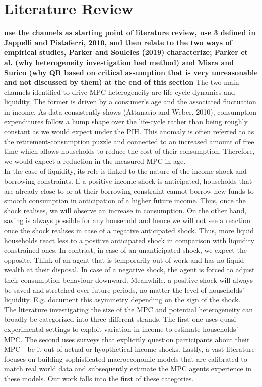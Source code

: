 \section{Literature Review} \label{sec:lit}
\textbf{use the channels as starting point of literature review, use 3 defined in Jappelli and Pistaferri, 2010, and then relate to the two ways of empirical studies, Parker and Souleles (2019) characterize; Parker et al. (why heterogeneity investigation bad method) and Misra and Surico (why QR based on critical assumption that is very unreasonable and not discussed by them) at the end of this section}
The two main channels identified to drive MPC heterogeneity are life-cycle dynamics and liquidity. The former is driven by a consumer's age and the associated fluctuation in income. As data consistently shows (Attanasio and Weber, 2010), consumption expenditures follow a hump shape over the life-cycle rather than being roughly constant as we would expect under the PIH. This anomaly is often referred to as the retirement-consumption puzzle and connected to an increased amount of free time which allows households to reduce the cost of their consumption. Therefore, we would expect a reduction in the measured MPC in age. \\
In the case of liquidity, its role is linked to the nature of the income shock and borrowing constraints. If a positive income shock is anticipated, households that are already close to or at their borrowing constraint cannot borrow new funds to smooth consumption in anticipation of a higher future income. Thus, once the shock realises, we will observe an increase in consumption. On the other hand, saving is always possible for any household and hence we will not see a reaction once the shock realises in case of a negative anticipated shock. Thus, more liquid households react less to a positive anticipated shock in comparison with liquidity constrained ones. In contrast, in case of an unanticipated shock, we expect the opposite. Think of an agent that is temporarily out of work and has no liquid wealth at their disposal. In case of a negative shock, the agent is forced to adjust their consumption behaviour downward. Meanwhile, a positive shock will always be saved and stretched over future periods, no matter the level of households' liquidity. E.g. \cite{bunn_etal} document this asymmetry depending on the sign of the shock. \\
The literature investigating the size of the MPC and potential heterogeneity can broadly be categorized into three different strands. The first one uses quasi-experimental settings to exploit variation in income to estimate households' MPC. The second uses surveys that explicitly question participants about their MPC - be it out of actual or hyopthetical income shocks. Lastly, a vast literature focuses on building sophisticated macroeconomic models that are calibrated to match real world data and subsequently estimate the MPC agents experience in these models. Our work falls into the first of these categories.\\
